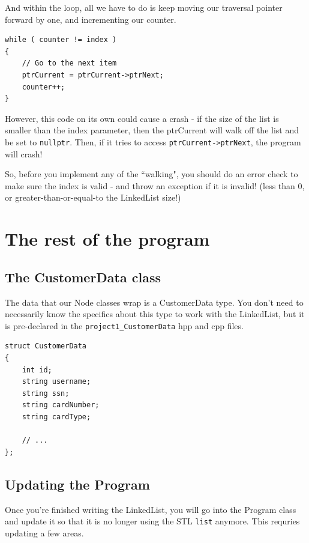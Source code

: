 \documentclass[a4paper,12pt,oneside]{book}
\begin{document}
    And within the loop, all we have to do is keep moving our traversal
    pointer forward by one, and incrementing our counter.
    
\begin{lstlisting}[style=code]
while ( counter != index )
{
    // Go to the next item
    ptrCurrent = ptrCurrent->ptrNext; 
    counter++;
}
\end{lstlisting} 

    However, this code on its own could cause a crash - if the size
    of the list is smaller than the index parameter, then the 
    ptrCurrent will walk off the list and be set to \texttt{nullptr}.
    Then, if it tries to access \texttt{ptrCurrent->ptrNext}, the program
    will crash!
    
    So, before you implement any of the ``walking", you should do an error
    check to make sure the index is valid - and throw an exception if
    it is invalid! (less than 0, or greater-than-or-equal-to the LinkedList size!)
    
    
    \chapter{The rest of the program}
    
    \section{The CustomerData class}
    
    The data that our Node classes wrap is a CustomerData type.
    You don't need to necessarily know the specifics about this
    type to work with the LinkedList, but it is pre-declared
    in the \texttt{project1\_CustomerData} hpp and cpp files.
    
\begin{lstlisting}[style=code]
struct CustomerData
{
    int id;
    string username;
    string ssn;
    string cardNumber;
    string cardType;

    // ...
};
\end{lstlisting} 
    
    \section{Updating the Program}
    
    Once you're finished writing the LinkedList, you will go into the
    Program class and update it so that it is no longer using the
    STL \texttt{list} anymore. This requries updating a few areas.
    
\end{document}
